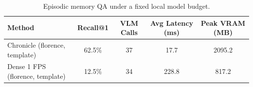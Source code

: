 \begin{table}[t]
  \centering
  \caption{Episodic memory QA under a fixed local model budget.}
  \label{tab:chronicle-vs-dense}
  \begin{tabular}{lcccc}
    \toprule
    Method & Recall@1 & VLM Calls & Avg Latency (ms) & Peak VRAM (MB) \\
    \midrule
    Chronicle (florence, template) & 62.5\% & 37 & 17.7 & 2095.2 \\
    Dense 1 FPS (florence, template) & 12.5\% & 34 & 228.8 & 817.2 \\
    \bottomrule
  \end{tabular}
\end{table}
